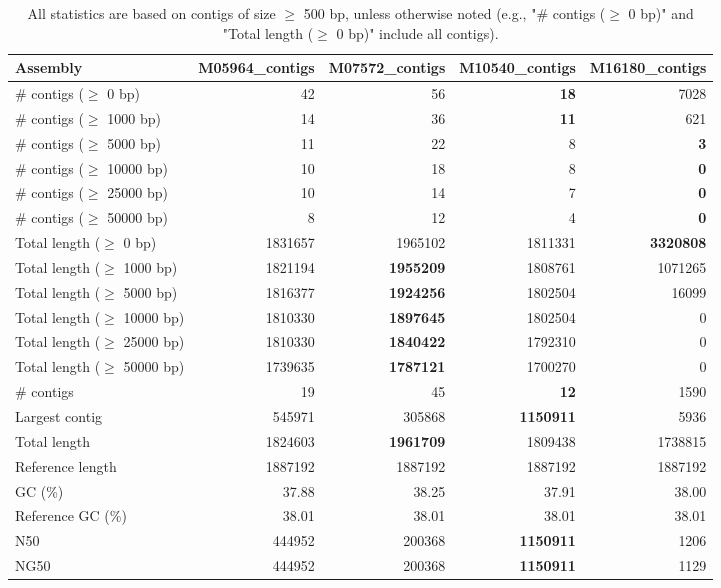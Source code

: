 \documentclass[12pt,a4paper]{article}
\begin{document}
\begin{table}[ht]
\begin{center}
\caption{All statistics are based on contigs of size $\geq$ 500 bp, unless otherwise noted (e.g., "\# contigs ($\geq$ 0 bp)" and "Total length ($\geq$ 0 bp)" include all contigs).}
\begin{tabular}{|l*{4}{|r}|}
\hline
Assembly & M05964\_contigs & M07572\_contigs & M10540\_contigs & M16180\_contigs \\ \hline
\# contigs ($\geq$ 0 bp) & 42 & 56 & {\bf 18} & 7028 \\ \hline
\# contigs ($\geq$ 1000 bp) & 14 & 36 & {\bf 11} & 621 \\ \hline
\# contigs ($\geq$ 5000 bp) & 11 & 22 & 8 & {\bf 3} \\ \hline
\# contigs ($\geq$ 10000 bp) & 10 & 18 & 8 & {\bf 0} \\ \hline
\# contigs ($\geq$ 25000 bp) & 10 & 14 & 7 & {\bf 0} \\ \hline
\# contigs ($\geq$ 50000 bp) & 8 & 12 & 4 & {\bf 0} \\ \hline
Total length ($\geq$ 0 bp) & 1831657 & 1965102 & 1811331 & {\bf 3320808} \\ \hline
Total length ($\geq$ 1000 bp) & 1821194 & {\bf 1955209} & 1808761 & 1071265 \\ \hline
Total length ($\geq$ 5000 bp) & 1816377 & {\bf 1924256} & 1802504 & 16099 \\ \hline
Total length ($\geq$ 10000 bp) & 1810330 & {\bf 1897645} & 1802504 & 0 \\ \hline
Total length ($\geq$ 25000 bp) & 1810330 & {\bf 1840422} & 1792310 & 0 \\ \hline
Total length ($\geq$ 50000 bp) & 1739635 & {\bf 1787121} & 1700270 & 0 \\ \hline
\# contigs & 19 & 45 & {\bf 12} & 1590 \\ \hline
Largest contig & 545971 & 305868 & {\bf 1150911} & 5936 \\ \hline
Total length & 1824603 & {\bf 1961709} & 1809438 & 1738815 \\ \hline
Reference length & 1887192 & 1887192 & 1887192 & 1887192 \\ \hline
GC (\%) & 37.88 & 38.25 & 37.91 & 38.00 \\ \hline
Reference GC (\%) & 38.01 & 38.01 & 38.01 & 38.01 \\ \hline
N50 & 444952 & 200368 & {\bf 1150911} & 1206 \\ \hline
NG50 & 444952 & 200368 & {\bf 1150911} & 1129 \\ \hline

\end{tabular}
\end{center}
\end{table}
\end{document}
